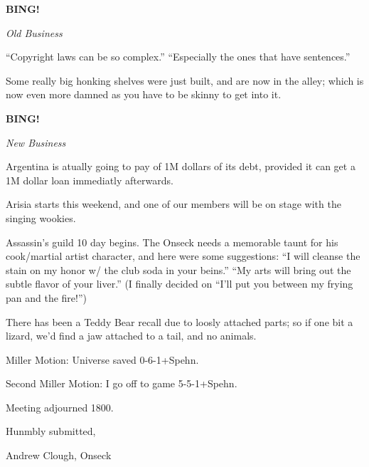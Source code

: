 \documentclass[12pt]{article}
\newcommand{\bing}{{\bf BING!} }
\newcommand{\goto}[1]{\bing \vskip 12pt \centerline{{\em{#1}}}}
\begin{document}
\goto{Old Business}

``Copyright laws can be so complex.''  ``Especially the ones that have sentences.''

Some really big honking shelves were just built, and are now in the alley; which is now even more damned as you have to be skinny to get into it.

\goto{New Business}

Argentina is atually going to pay of 1M dollars of its debt, provided it can get a 1M dollar loan immediatly afterwards.

Arisia starts this weekend, and one of our members will be on stage with the singing wookies.

Assassin's guild 10 day begins.  The Onseck needs a memorable taunt for his cook/martial artist character, and here were some suggestions: ``I will cleanse the stain on my honor w/ the club soda in your beins.''  ``My arts will bring out the subtle flavor of your liver.''  (I finally decided on ``I'll put you between my frying pan and the fire!'')

There has been a Teddy Bear recall due to loosly attached parts; so if one bit a lizard, we'd find a jaw attached to a tail, and no animals.

Miller Motion:  Universe saved 0-6-1+Spehn.

Second Miller Motion:  I go off to game 5-5-1+Spehn.

\vspace{12pt}

\noindent
Meeting adjourned 1800.

\vspace{18pt}

\centerline{Hunmbly submitted,}
\centerline{Andrew Clough, Onseck}
\end{document}
